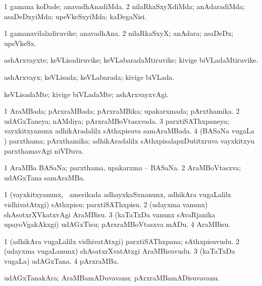 \bentry
{}
\gl{\kirxvi}
\bmng
\bnum
\num{1} gamana koDade; anavadhAnadiMda. 
\num{2} nilaRkaSxyXdiMda; anAdaradiMda; asaDeDxyiMda; upeVkeSxyiMda; kaDegaNisi. 
\enum
\emng
\eentry

\bentry
{}
\gl{\nA}
\bmng
\bnum
\num{1} gamanavilalxdiruvike; anavadhAna. 
\num{2} nilaRkaSxyX; anAdara; asaDeDx; upeVkeSx. 
\enum
\emng
\eentry

\bentry
{}
\gl{\nA}
\bmng
ashArxvayxte; keVLisadiruvike; keVLabaradaMtiruvike; kivige biVLadaMtiruvike. 
\emng
\eentry

\bentry
{}
\gl{\gu}
\bmng
ashArxvayx; keVLisada; keVLabarada; kivige biVLada. 
\emng
\eentry

\bentry
{}
\gl{\kirxvi}
\bmng
keVLisadaMte; kivige biVLadaMte; ashArxvayxvAgi. 
\emng
\eentry

\bentry
{}
\gl{\gu}
\bmng
\bnum
\num{1} AraMBada; pArxraMBada; pArxraMBika; upakarxmada; pArxthamika. 
\num{2} udAGxTaneya; nAMdiya; pArxraMBoVtasxvada. 
\num{3} parxtiSAThxpaneya; vayxkitxyanunx adhikAradalilx sAthxpisuva samAraMBada. 
\num{4} (BASaNa \mo vugaLa \vi) parxthama; pArxthamika; adhikAradalilx sAthxpisalapxDutitxruva vayxkitxyu parxthamavAgi niVDuva. 
\enum
\emng
\eentry

\bentry
{}
\gl{\nA}
\bmng
\bnum
\num{1} AraMBa BASaNa; parxthama, upakarxma -- BASaNa. 
\num{2} AraMBoVtasxva; udAGxTana samAraMBa. 
\enum
\emng
\eentry

\bentry
{}
\gl{\sakirx}
\bmng
\bnum
\num{1} (vayxkitxyanunx, \kanmu\ amerikada adhayxkaSxnanunx, adhikAra \mo vugaLalilx vidhivatAtxgi) sAthxpisu; parxtiSAThxpisu. 
\num{2} (udayxma \mo vanunx) shAsotxrXVkatxvAgi AraMBisu. 
\num{3} (kaTaTxDa \mo vanunx sAvaRjanika upayoVgakAkxgi) udAGxTisu; pArxraMBoVtasxva mADu. 
\num{4} AraMBisu. 
\enum
\emng
\eentry

\bentry
{}
\gl{\nA}
\bmng
\bnum
\num{1} (adhikAra \mo vugaLalilx vidhivatAtxgi) parxtiSAThxpana; sAthxpisuvudu. 
\num{2} (udayxma \mo vugaLanunx) shAsatxrXvatAtxgi AraMBisuvudu. 
\num{3} (kaTaTxDa \mo vugaLa) udAGxTana. 
\num{4} pArxraMBa. 
\enum
\emng
\eentry

\bentry
{}
\gl{\nA}
\bmng
udAGxTanakAra; AraMBamADuvavanu; pArxraMBamADisuvavanu. 
\emng
\eentry

